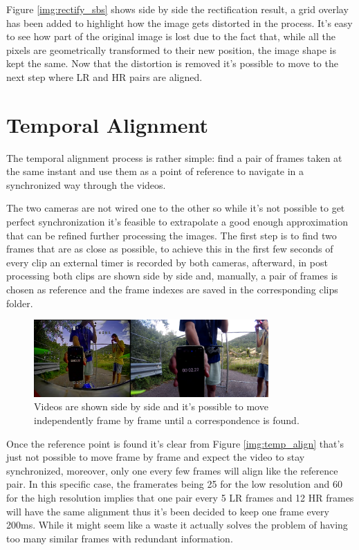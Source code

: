 Figure \ref{img:rectify_sbs} shows side by side the rectification result, a grid overlay has been added to highlight how the image gets distorted in the process. It's easy to see how part of the original image is lost due to the fact that, while all the pixels are geometrically transformed to their new position, the image shape is kept the same. Now that the distortion is removed it's possible to move to the next step where LR and HR pairs are aligned.

\section{Temporal Alignment}
\label{sec:temp_align}

The temporal alignment process is rather simple: find a pair of frames taken at the same instant and use them as a point of reference to navigate in a synchronized way through the videos.

The two cameras are not wired one to the other so while it's not possible to get perfect synchronization it's feasible to extrapolate a good enough approximation that can be refined further processing the images. The first step is to find two frames that are as close as possible, to achieve this in the first few seconds of every clip an external timer is recorded by both cameras, afterward, in post processing both clips are shown side by side and, manually, a pair of frames is chosen as reference and the frame indexes are saved in the corresponding clips folder.

\begin{figure}[H]
  \centering
  \includegraphics[width=0.8\textwidth]{figures/time_sync_kp.png}
  \caption{Videos are shown side by side and it's possible to move independently frame by frame until a correspondence is found.}
  \label{img:time_sync}
\end{figure}

Once the reference point is found it's clear from Figure \ref{img:temp_align} that's just not possible to move frame by frame and expect the video to stay synchronized, moreover, only one every few frames will align like the reference pair. In this specific case, the framerates being 25 for the low resolution and 60 for the high resolution implies that one pair every 5 LR frames and 12 HR frames will have the same alignment thus it's been decided to keep one frame every 200ms. While it might seem like a waste it actually solves the problem of having too many similar frames with redundant information.

